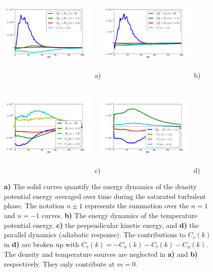 \documentclass[twocolumn,showpacs,preprintnumbers,amsmath,amssymb]{revtex4}
\begin{document}
\begin{figure}
\includegraphics[width=0.42\textwidth,height=50mm]{density_dynamics}~a)
\hfil
\includegraphics[width=0.42\textwidth,height=50mm]{temperature_dynamics}~b)
\hfil
\includegraphics[width=0.42\textwidth,height=50mm]{potential_dynamics}~c)
\hfil
\includegraphics[width=0.42\textwidth,height=50mm]{parallel_dynamics}~d)
\hfil
\caption{\textbf{a)} The solid curves quantify the energy dynamics of the density potential energy averaged over time during the saturated turbulent phase. The notation $n \pm 1$ represents the
summation over the $n=1$ and $n=-1$ curves. \textbf{b)} The energy dynamics of the temperature potential energy, \textbf{c)} the perpendicular kinetic energy, and \textbf{d)} the parallel
dynamics (adiabatic response). The contributions to $C_v(k)$ in \textbf{d)} are broken up with $C_v(k) = -C_n(k) - C_t(k) - C_\phi(k)$. 
The density and temperature sources are neglected in \textbf{a)} and \textbf{b)} respectively. They only contribute at $m=0$.}
\label{nc_dynamics_figures}
\end{figure}
\end{document}
